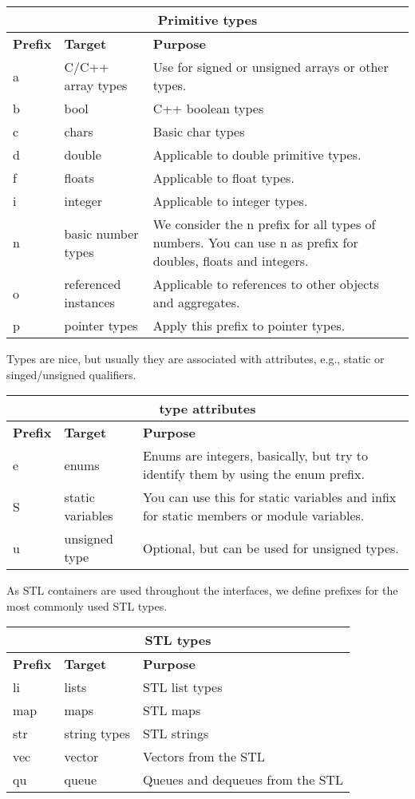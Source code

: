 \begin{tabular}{|l|l|p{10cm}|}
\multicolumn{3}{c}{\textbf{Primitive types}}\\\hline
\textbf{Prefix} & \textbf{Target} & \textbf{Purpose} \\\hline
a   & C/C++ array types & Use for signed or unsigned arrays or other types.\\\hline
b   & bool               & C++ boolean types\\\hline
c   & chars & Basic char types\\\hline
d   & double & Applicable to double primitive types.\\\hline
f   & floats & Applicable to float types.\\\hline
i   & integer & Applicable to integer types. \\\hline
n   & basic number types & We consider the n prefix for all types of numbers.
                          You can use n as prefix for doubles, floats and
                          integers.\\\hline
o   & referenced instances & Applicable to references to other objects
                           and aggregates.\\\hline
p   & pointer types & Apply this prefix to pointer types.\\\hline
\end{tabular}

Types are nice, but usually they are associated with attributes, e.g., static or singed/unsigned qualifiers.

\begin{tabular}{|l|l|p{10cm}|}
\multicolumn{3}{c}{\textbf{type attributes}}\\\hline
\textbf{Prefix} & \textbf{Target} & \textbf{Purpose} \\\hline
e   & enums & Enums are integers, basically, but try to identify them
              by using the enum prefix.\\\hline
S   & static variables & You can use this for static variables and infix for
                       static members or module variables.\\\hline
u   & unsigned type & Optional, but can be used for unsigned types.\\\hline
\end{tabular}

As STL containers are used throughout the interfaces, we define prefixes for the most commonly used STL types.

\begin{tabular}{|l|l|p{10cm}|}
\multicolumn{3}{c}{\textbf{STL types}}\\\hline
\textbf{Prefix} & \textbf{Target} & \textbf{Purpose} \\\hline
li  & lists & STL list types\\\hline
map  & maps  & STL maps\\\hline
str   & string types & STL strings \\\hline
vec  & vector & Vectors from the STL\\\hline
qu   & queue & Queues and dequeues from the STL\\\hline
\end{tabular}


